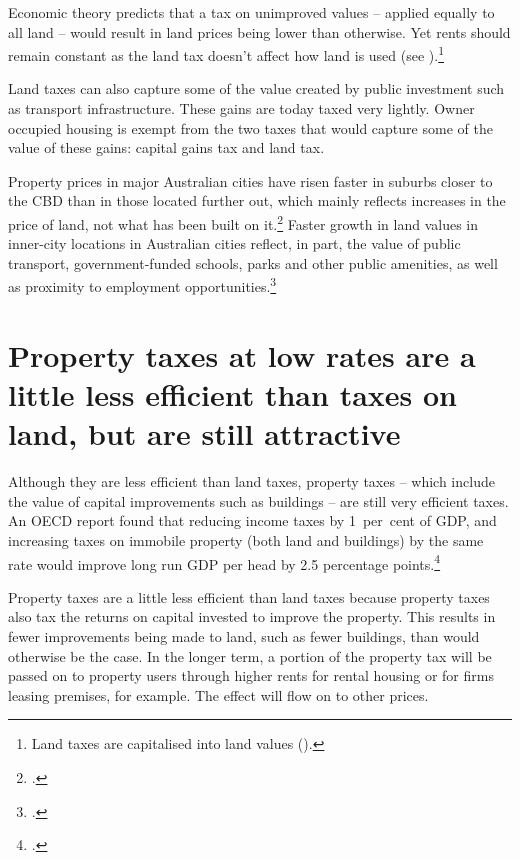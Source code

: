 \documentclass[twoside,english]{palatinob5ona4portrait}
\begin{document}
Economic theory predicts that a tax on unimproved values – applied equally to all land – would result in land prices being lower than otherwise. Yet rents should remain constant as the land tax doesn’t affect how land is used (see ).\footnote{Land taxes are capitalised into land values (\textcite[][247--248]{HenryTaxReview2010}).}   

Land taxes can also capture some of the value created by public investment such as transport infrastructure. These gains are today taxed very lightly. Owner occupied housing is exempt from the two taxes that would capture some of the value of these gains: capital gains tax and land tax. 

Property prices in major Australian cities have risen faster in suburbs closer to the CBD than in those located further out, which mainly reflects increases in the price of land, not what has been built on it.\footcite[][22]{KulishRichardsGillitzer2011}  Faster growth in land values in inner-city locations in Australian cities reflect, in part, the value of public transport, government-funded schools, parks and other public amenities, as well as proximity to employment opportunities.\footcite[][87]{KellyDonegan2015}

\section{Property taxes at low rates are a little less efficient than taxes on land, but are still attractive\label{sec:PROP-4-2}}
Although they are less efficient than land taxes, property taxes -- which include the value of capital improvements such as buildings -- are still very efficient taxes. An OECD report found that reducing income taxes by 1~per~cent of GDP, and increasing taxes on immobile property (both land and buildings) by the same rate would improve long run GDP per head by 2.5 percentage points.\footcite[][58]{JohanssonHeadyArnoldEtAl2008}

Property taxes are a little less efficient than land taxes because property taxes also tax the returns on capital invested to improve the property. This results in fewer improvements being made to land, such as fewer buildings, than would otherwise be the case. In the longer term, a portion of the property tax will be passed on to property users through higher rents for rental housing or for firms leasing premises, for example. The effect will flow on to other prices.
\end{document}
